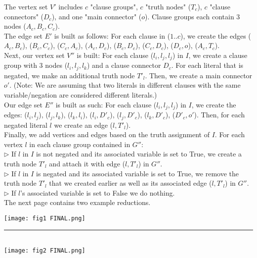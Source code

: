 \documentclass[11pt]{article}
\begin{document}
\begin{enumerate}
\begin{soln}
The vertex set $V'$ includes $c$ "clause groups", $c$ "truth nodes" ($T_c$), $c$ "clause connectors" ($D_c$), and one "main connector" ($o$). Clause groups each contain 3 nodes ($A_c, B_c, C_c$). \\ 

The edge set $E'$ is built as follows: For each clause in ($1..c$), we create the edges ($A_c, B_c$), ($B_c, C_c$), ($C_c, A_c$), ($A_c, D_c$), ($B_c, D_c$), ($C_c, D_c$), ($D_c, o$), ($A_c, T_c$). \\

Next, our vertex set $V''$ is built: For each clause ($l_i, l_j, l_j$) in $I$, we create a clause group with 3 nodes ($l_i, l_j, l_k$) and a clause connector $D_c$. For each literal that is negated, we make an additional truth node $T'_l$. Then, we create a main connector $o'$. (Note: We are assuming that two literals in different clauses with the same variable/negation are considered different literals.) \\

Our edge set $E''$ is built as such: For each clause ($l_i, l_j, l_j$) in $I$, we create the edges: ($l_i, l_j$), ($l_j, l_k$), ($l_k, l_i$), ($l_i, D'_c$), ($l_j, D'_c$), ($l_k, D'_c$), ($D'_c, o'$). Then, for each negated literal $l$ we create an edge ($l, T'_l$). \\

Finally, we add vertices and edges based on the truth assignment of $I$. For each vertex $l$ in each clause group contained in $G''$: \\

$\triangleright$ If $l$ in $I$ is not negated and its associated variable is set to True, we create a truth node $T'_l$ and attach it with edge ($l, T'_l$) in $G''$. \\
$\triangleright$ If $l$ in $I$ is negated and its associated variable is set to True, we remove the truth node $T'_l$ that we created earlier as well as its associated edge ($l, T'_l$) in $G''$. \\
$\triangleright$ If $l$'s associated variable is set to False we do nothing. \\

The next page contains two example reductions.

\newpage

\texttt{[image: fig1 FINAL.png]} \\
\rule{16cm}{0.4pt} \\
\texttt{[image: fig2 FINAL.png]} \\


\end{soln}
\end{enumerate}
\end{document}
